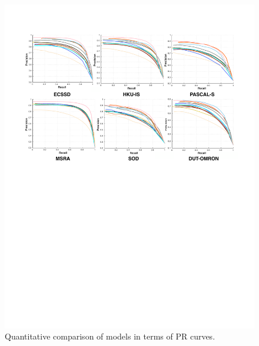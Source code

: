 \documentclass[journal]{IEEEtran}
\begin{document}
\begin{figure}[htbp]
\begin{center}
\includegraphics[width=1\linewidth]{pr_merge.pdf}
\end{center}
\vspace{-10pt}
\caption{Quantitative comparison of models in terms of PR curves.}
\label{fig:8_1}
\end{figure}
\end{document}
